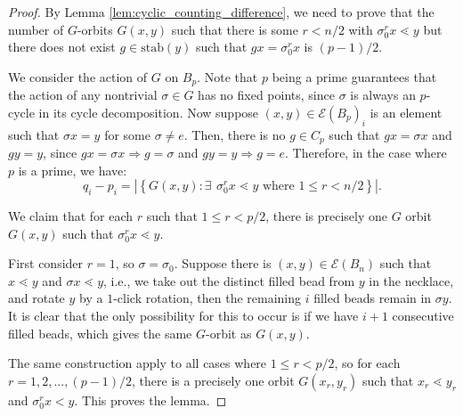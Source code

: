 \documentclass[10 pt]{amsart}
\theoremstyle{plain}
\theoremstyle{definition}
\theoremstyle{remark}
\numberwithin{equation}{section}
\newcommand{\so}{\Rightarrow}
\begin{document}
\begin{proof}  By Lemma \ref{lem:cyclic_counting_difference}, we need to prove that the number of $G$-orbits $G(x,y)$ such that there is some $r < n/2$ with $\sigma_0^r x \lessdot y$ but there does not exist $g \in \text{stab}(y)$ such that $gx = \sigma_0^r x$ is $(p-1)/2.$ 

 We consider the action of $G$ on $B_p$. 
 Note that $p$ being a prime guarantees that the action of any nontrivial $\sigma \in G$ has no fixed points, since $\sigma$ is always an $p$-cycle in its cycle decomposition. Now suppose $(x, y) \in  \mathcal E(B_p)_i$  is an element such that $\sigma x =y$ for some $\sigma \neq e$. Then, there is no $g \in C_p$ such that $gx = \sigma x$ and $g y = y$, since $gx = \sigma x \so g = \sigma $ and $g y = y \so g = e$. Therefore, in the case where $p$ is a prime,  we have: 
 $$q_i - p_i = |\left\{G{(x, y)} : \exists \: \, \sigma_0^r x \lessdot y \text{ where } 1 \le r < n/2 \right\}|.$$


We claim that for each $r$ such that $1 \le r < p/2$, there is precisely one $G$ orbit $G(x, y)$ such that $\sigma_0^r x \lessdot y$. 

First consider $r = 1$, so $\sigma = \sigma_0$. Suppose there is $(x,y) \in  \mathcal E(B_n)$ such that $x \lessdot y$ and $\sigma x \lessdot y$, i.e., we take out the distinct filled bead from $y$ in the necklace, and rotate $y$ by a $1$-click rotation, then the remaining $i$ filled beads remain in $\sigma y$. It is clear that the only possibility for this to occur is if we have $i+1$ consecutive filled beads, which gives the same $G$-orbit as $G(x, y)$.

The same construction apply to all cases where $1 \le r < p/2$, so for each $r = 1, 2, ..., (p-1)/2$, there is a precisely one orbit $G(x_r,y_r)$ such that $x_r \lessdot y_r$ and $\sigma_0^r  x < y$. This proves the lemma.
\end{proof}
\end{document}
